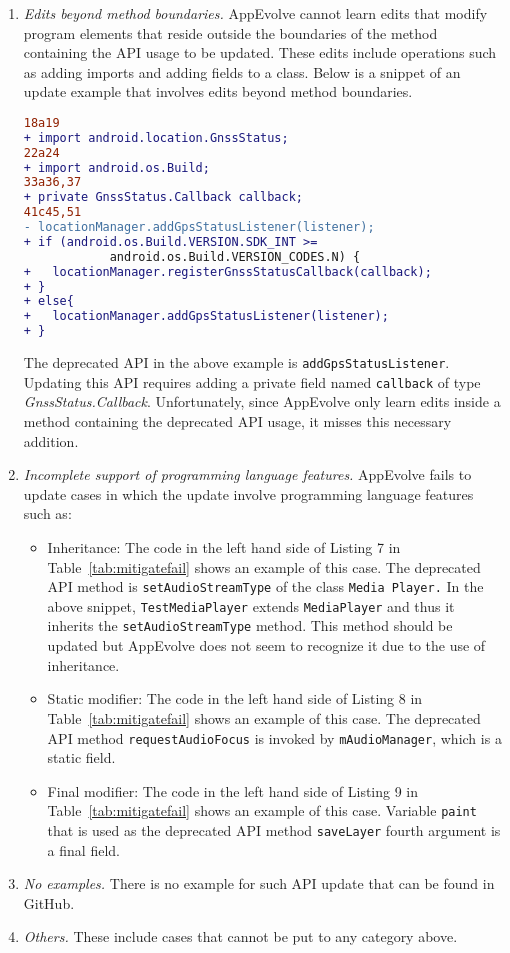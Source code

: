 \begin{enumerate}
\item {\em Edits beyond method boundaries.} AppEvolve cannot learn edits that modify program elements that reside outside the boundaries of the method containing the API usage to be updated. These edits include operations such as adding imports and adding fields to a class. Below is a snippet of an update example that involves edits beyond method boundaries.
\begin{lstlisting}[language=diff,numbers=none,caption=Edits that add imports and a private field,captionpos=b]
18a19
+ import android.location.GnssStatus;
22a24
+ import android.os.Build;
33a36,37
+ private GnssStatus.Callback callback;
41c45,51
- locationManager.addGpsStatusListener(listener);
+ if (android.os.Build.VERSION.SDK_INT >= 
            android.os.Build.VERSION_CODES.N) {
+   locationManager.registerGnssStatusCallback(callback);
+ }
+ else{
+   locationManager.addGpsStatusListener(listener);
+ }
\end{lstlisting}
The deprecated API in the above example is {\tt addGpsStatusListener}. Updating this API requires adding a private field named {\tt callback} of type {\em GnssStatus.Callback}. Unfortunately, since AppEvolve only learn edits inside a method containing the deprecated API usage, it misses this necessary addition.

\item {\em Incomplete support of programming language features.} AppEvolve fails to update cases in which the update involve programming language features such as:
\begin{itemize}
\item Inheritance: The code in the left hand side of Listing 7 in Table~\ref{tab:mitigatefail} shows an example of this case.  The deprecated API method is {\tt setAudioStreamType} of the class {\tt Media Player.} In the above snippet, {\tt TestMediaPlayer} extends {\tt MediaPlayer} and thus it inherits the {\tt setAudioStreamType} method. This method should be updated but AppEvolve does not seem to recognize it due to the use of inheritance.
\item Static modifier:  The code in the left hand side of Listing 8 in Table~\ref{tab:mitigatefail} shows an example of this case.  The deprecated API method {\tt requestAudioFocus} is invoked by {\tt mAudioManager}, which is a static field.

\item Final modifier: The code in the left hand side of Listing 9 in Table~\ref{tab:mitigatefail} shows an example of this case.  Variable {\tt paint} that is used as the deprecated API method {\tt saveLayer} fourth argument is a final field.

\end{itemize}

\item {\em No examples.} There is no example for such API update that can be found in GitHub. 

\item {\em Others.} These include cases that cannot be put to any category above.
\end{enumerate}


